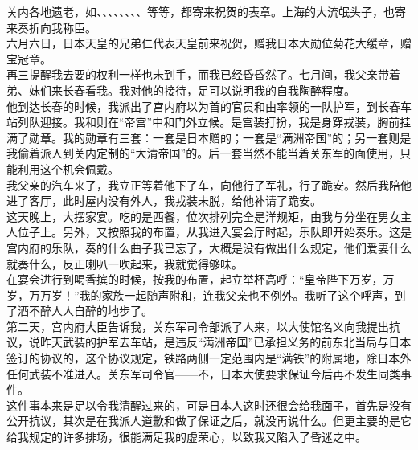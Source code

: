 关内各地遗老，如、、、、、、、、等等，都寄来祝贺的表章。上海的大流氓头子，也寄来奏折向我称臣。\\

六月六日，日本天皇的兄弟仁代表天皇前来祝贺，赠我日本大勋位菊花大缓章，赠宝冠章。\\

再三提醒我去要的权利一样也未到手，而我已经昏昏然了。七月间，我父亲带着弟、妹们来长春看我。我对他的接待，足可以说明我的自我陶醉程度。\\

他到达长春的时候，我派出了宫内府以为首的官员和由率领的一队护军，到长春车站列队迎接。我和则在“帝宫”中和门外立候。是宫装打扮，我是身穿戎装，胸前挂满了勋章。我的勋章有三套：一套是日本赠的；一套是“满洲帝国”的；另一套则是我偷着派人到关内定制的“大清帝国”的。后一套当然不能当着关东军的面使用，只能利用这个机会佩戴。\\

我父亲的汽车来了，我立正等着他下了车，向他行了军礼，行了跪安。然后我陪他进了客厅，此时屋内没有外人，我戎装未脱，给他补请了跪安。\\

这天晚上，大摆家宴。吃的是西餐，位次排列完全是洋规矩，由我与分坐在男女主人位子上。另外，又按照我的布置，从我进入宴会厅时起，乐队即开始奏乐。这是宫内府的乐队，奏的什么曲子我已忘了，大概是没有做出什么规定，他们爱妻什么就奏什么，反正喇叭一吹起来，我就觉得够味。\\

在宴会进行到喝香摈的时候，按我的布置，起立举杯高呼：“皇帝陛下万岁，万岁，万万岁！”我的家族一起随声附和，连我父亲也不例外。我听了这个呼声，到了酒不醉人人自醉的地步了。\\

第二天，宫内府大臣告诉我，关东军司令部派了人来，以大使馆名义向我提出抗议，说昨天武装的护军去车站，是违反“满洲帝国”已承担义务的前东北当局与日本签订的协议的，这个协议规定，铁路两侧一定范围内是“满铁”的附属地，除日本外任何武装不准进入。关东军司令官——不，日本大使要求保证今后再不发生同类事件。\\

这件事本来是足以令我清醒过来的，可是日本人这时还很会给我面子，首先是没有公开抗议，其次是在我派人道歉和做了保证之后，就没再说什么。但更主要的是它给我规定的许多排场，很能满足我的虚荣心，以致我又陷入了昏迷之中。\\

